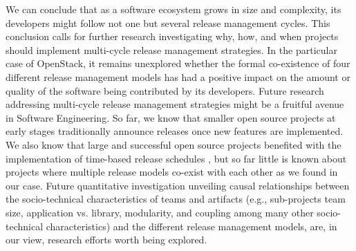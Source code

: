 \documentclass[dvipsnames]{bmcart}
\theoremstyle{definition}
\begin{document}
We can conclude that as a software ecosystem grows in size and complexity, its developers might follow not one but several release management cycles. This conclusion calls for further research investigating why, how, and when projects should implement multi-cycle release management strategies. In the particular case of OpenStack, it remains unexplored whether the formal co-existence of four different release management models has had a positive impact on the amount or quality of the software being contributed by its developers. Future research addressing multi-cycle release management strategies might be a fruitful avenue in Software Engineering. So far, we know that smaller open source projects at early stages traditionally announce releases once new features are implemented. We also know that large and successful open source projects benefited with the implementation of time-based release schedules \citep{michlmayr2015and}, but so far little is known about projects where multiple release models co-exist with each other as we found in our case. Future quantitative investigation unveiling causal relationships between the socio-technical characteristics of teams and artifacts (e.g., sub-projects team size, application vs. library, modularity, and coupling among many other socio-technical characteristics) and the different release management models, are,  in our view, research efforts worth being explored.                                                                                                                                                                                                                                                                                                                                                                                                                                                                                                                                                                                                                                                                                                                                                                                                                                                                                                                                                                                                                                                                                                                                                                                                                                                                                                                                                                                                                                                                                                                                                                                                                                                                                                                                                                                                                                                                                                                                                                                     
\end{document}
